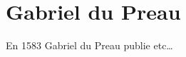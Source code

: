 \documentclass[a4]{article}
\begin{document}
\tableofcontents
\section{Gabriel du Preau}

En 1583 Gabriel du Preau publie etc…
\end{document}
